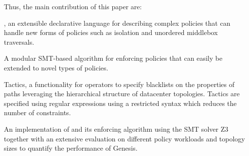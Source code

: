 
Thus, the main contribution of this paper are: 
\begin{compactitemize}
\item \Name, an extensible declarative language for describing complex policies that can
		handle new forms of policies such as isolation and unordered middlebox traversals.				
\item A modular SMT-based algorithm for enforcing \Name policies that can easily be extended
			to novel types of policies.
\item Tactics, a functionality for operators to specify blacklists on the properties of paths
 leveraging the hierarchical structure of datacenter topologies. 
 Tactics are specified using regular expressions using a restricted syntax which reduces the number of constraints.
\item An implementation of \Name and its enforcing algorithm using the SMT
		solver Z3 together with an extensive evaluation on different policy workloads and topology 
		sizes to quantify the performance of Genesis. 
\end{compactitemize}


